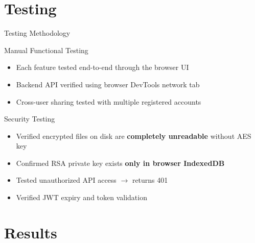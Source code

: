 \documentclass{SKP-beamer}
\begin{document}
\section{Testing}

\begin{frame}{Testing Methodology}
\begin{block}{Manual Functional Testing}
\begin{itemize}
  \item Each feature tested end-to-end through the browser UI
  \item Backend API verified using browser DevTools network tab
  \item Cross-user sharing tested with multiple registered accounts
\end{itemize}
\end{block}

\begin{block}{Security Testing}
\begin{itemize}
  \item Verified encrypted files on disk are \textbf{completely unreadable} without AES key
  \item Confirmed RSA private key exists \textbf{only in browser IndexedDB}
  \item Tested unauthorized API access $\rightarrow$ returns 401
  \item Verified JWT expiry and token validation
\end{itemize}
\end{block}
\end{frame}

\section{Results}
\end{document}
